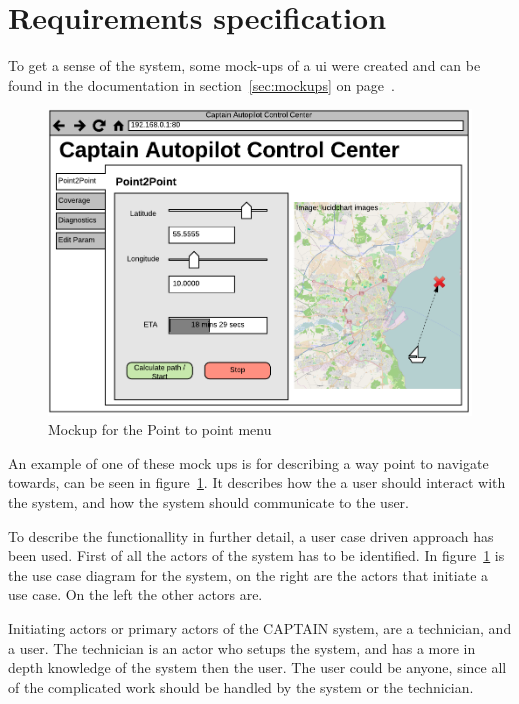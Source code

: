\section{Requirements specification}
To get a sense of the system, some mock-ups of a ui were created and can be found in the documentation in section~\ref{sec:mockups} on page~\pageref{sec:mockups}.

\begin{figure}[H]
\centering
\includegraphics[width=0.7\linewidth]{../Appendix/Project/Dokumentation/Images/Requirements_specification/UI_Mockup_Point_to_point}
\caption{Mockup for the Point to point menu}
\label{fig:uimockuppointtopoint}
\end{figure}

An example of one of these mock ups is for describing a way point to navigate towards, can be seen in figure~\ref{fig:uimockuppointtopoint}. It describes how the a user should interact with the system, and how the system should communicate to the user.

To describe the functionallity in further detail, a user case driven approach has been used. First of all the actors of the system has to be identified. In figure~\ref{fig:uimockuppointtopoint} is the use case diagram for the system, on the right are the actors that initiate a use case. On the left the other actors are.

Initiating actors or primary actors of the CAPTAIN system, are a technician, and a user. The technician is an actor who setups the system, and has a more in depth knowledge of the system then the user. The user could be anyone, since all of the complicated work should be handled by the system or the technician. 

